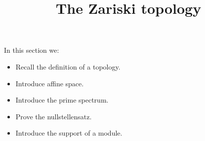 \documentclass{ximera}
\title{The Zariski topology}
\begin{document}
\begin{abstract}
\end{abstract}

\maketitle

In this section we:

\begin{itemize}
\item Recall the definition of a topology.
\item Introduce affine space.
\item Introduce the prime spectrum.
\item Prove the nullstellensatz.
\item Introduce the support of a module.
\end{itemize}
\end{document}
